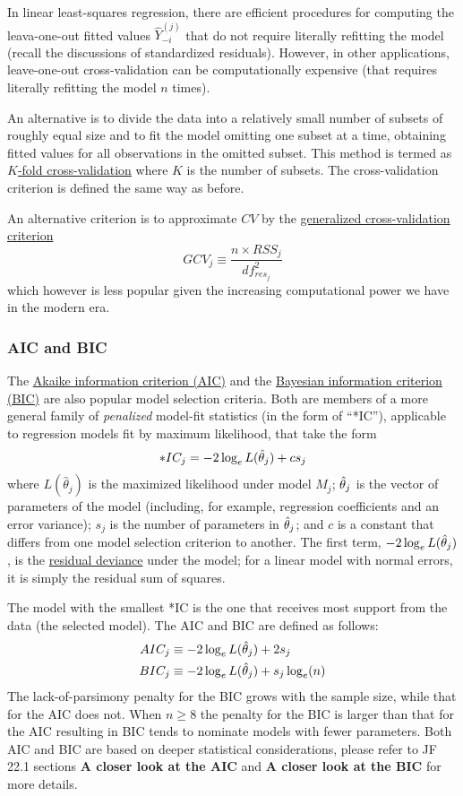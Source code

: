 In linear least-squares regression, there are efficient procedures for computing the leava-one-out fitted values $\hat{Y}_{-i}^{(j)}$ that do not require literally refitting the model (recall the discussions of standardized residuals).
However, in other applications, leave-one-out cross-validation can be computationally expensive (that requires literally refitting the model $n$ times).

An alternative is to divide the data into a relatively small number of subsets of roughly equal size and to fit the model omitting one subset at a time, obtaining fitted values for all observations in the omitted subset.
This method is termed as \underline{$K$-fold cross-validation} where $K$ is the number of subsets.
The cross-validation criterion is defined the same way as before.

An alternative criterion is to approximate $CV$ by the \underline{generalized cross-validation criterion}
$$
GCV_j \equiv \frac{n \times RSS_j}{df_{res_j}^2}
$$
which however is less popular given the increasing computational power we have in the modern era.

\subsubsection*{AIC and BIC}

The \underline{Akaike information criterion (AIC)} and the \underline{Bayesian information criterion (BIC)} are also popular model selection criteria.
Both are members of a more general family of {\it penalized} model-fit statistics (in the form of ``*IC''), applicable to regression models fit by maximum likelihood, that take the form
$$
*IC_j = -2 \log_e L(\hat{\mathbf{\theta}}_j) + c s_j
$$
where $L(\hat{\theta}_j)$ is the maximized likelihood under model $M_j$; $\hat{\mathbf{\theta}}_j$ is the vector of parameters of the model (including, for example, regression coefficients and an error variance); $s_j$ is the number of parameters in $\hat{\mathbf{\theta}}_j$; and $c$ is a constant that differs from one model selection criterion to another.
The first term, $-2 \log_e L(\hat{\mathbf{\theta}}_j)$, is the \underline{residual deviance} under the model; for a linear model with normal errors, it is simply the residual sum of squares.

The model with the smallest *IC is the one that receives most support from the data (the selected model).
The AIC and BIC are defined as follows:
$$
\begin{aligned}
	AIC_j &\equiv  -2 \log_e L(\hat{\mathbf{\theta}}_j) + 2 s_j\\
	BIC_j &\equiv  -2 \log_e L(\hat{\mathbf{\theta}}_j) + s_j \log_e(n)\\	
\end{aligned}
$$
The lack-of-parsimony penalty for the BIC grows with the sample size, while that for the AIC does not.
When $n \ge 8$ the penalty for the BIC is larger than that for the AIC resulting in BIC tends to nominate models with fewer parameters.
Both AIC and BIC are based on deeper statistical considerations, please refer to JF 22.1 sections {\bf A closer look at the AIC} and {\bf A closer look at the BIC} for more details.

